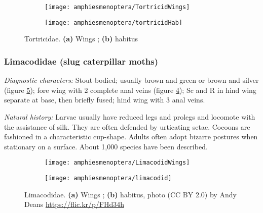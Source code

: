 \begin{figure}[ht!]
    \centering
    \begin{subfigure}[ht!]{0.35\textwidth}
        \texttt{[image: amphiesmenoptera/TortricidWings]}
        \caption{}
        \label{fig:tortricid1}
    \end{subfigure}
    \qquad
    \begin{subfigure}[ht!]{0.55\textwidth}
        \texttt{[image: amphiesmenoptera/tortricidHab]}
        \caption{}
        \label{fig:tortricid2}
    \end{subfigure}
    \caption{Tortricidae. \textbf{(a)} Wings \citep[Fig. 353]{comstock1918wings}; \textbf{(b)} habitus \citep[][Fig. 96]{saunders1883insects}}\label{fig:tortricids}
\end{figure}

\subsubsection{Limacodidae (slug caterpillar moths)}
\noindent{}\textit{Diagnostic characters:} Stout-bodied; usually brown and green or brown and silver (figure \ref{fig:limacodid2}); fore wing with 2 complete anal veins (figure \ref{fig:limacodid1}); Sc and R in hind wing separate at base, then briefly fused; hind wing with 3 anal veins.\vspace{3mm}

\noindent{}\textit{Natural history:} Larvae usually have reduced legs and prolegs and locomote with the assistance of silk. They are often defended by urticating setae. Cocoons are fashioned in a characteristic cup-shape. Adults often adopt bizarre postures when stationary on a surface. About 1,000 species have been described.

\begin{figure}[ht!]
    \centering
    \begin{subfigure}[ht!]{0.3\textwidth}
        \texttt{[image: amphiesmenoptera/LimacodidWings]}
        \caption{}
        \label{fig:limacodid1}
    \end{subfigure}
    \hfill 
    \begin{subfigure}[ht!]{0.55\textwidth}
        \texttt{[image: amphiesmenoptera/limacodid]}
        \caption{}
        \label{fig:limacodid2}
    \end{subfigure}
    \caption{Limacodidae. \textbf{(a)} Wings \citep[Fig. 349]{comstock1918wings}; \textbf{(b)} habitus, photo (CC BY 2.0) by Andy Deans \url{https://flic.kr/p/FHd34h}}\label{fig:limacodids}
\end{figure}

